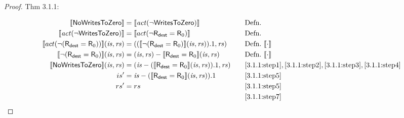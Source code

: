 \documentclass[12pt, letterpaper]{article}
\newcommand\interp[1]{\llbracket #1 \rrbracket}
\begin{document}
\begin{proof}
 Thm 3.1.1:
 \par\nobreak
 {\fontsize{10pt}{12pt}\selectfont
   \begin{alignat}{2}
     \setcounter{equation}{0}
     \label{3.1.1:step1}
     \interp{\mathsf{NoWritesToZero}}
     &= \interp{\mathit{act}(\neg \mathsf{WritesToZero})}
     &&\quad \text{Defn.}\\
     \label{3.1.1:step2}
     \interp{\mathit{act}(\neg \mathsf{WritesToZero})}
     &= \interp{act(\neg \mathsf{R}_{\mathsf{dest}} = \mathsf{R}_0)}
     &&\quad \text{Defn.}\\
     \label{3.1.1:step3}
     \interp{act(\neg(\mathsf{R}_{\mathsf{dest}} = \mathsf{R}_0))}(\mathit{is},\mathit{rs})
     &= ((\interp{\neg(\mathsf{R}_{\mathsf{dest}} = \mathsf{R}_0)}(\mathit{is},\mathit{rs})).1, \mathit{rs})
     &&\quad \text{Defn.}\ \interp{\cdot}\\    
     \label{3.1.1:step4}
     \interp{\neg(\mathsf{R}_{\mathsf{dest}} = \mathsf{R}_0)}(\mathit{is},\mathit{rs})
     &= (\mathit{is},\mathit{rs}) - \interp{\mathsf{R}_{\mathsf{dest}} = \mathsf{R}_0}(\mathit{is},\mathit{rs})
     &&\quad \text{Defn.}\ \interp{\cdot}\\    
     \label{3.1.1:step5}
     \interp{\mathsf{NoWritesToZero}}(\mathit{is},\mathit{rs})
     &= (\mathit{is} - (\interp{\mathsf{R}_{\mathsf{dest}} = \mathsf{R}_0}(\mathit{is},\mathit{rs})).1, \mathit{rs})
     &&\quad \ref{3.1.1:step1},\ref{3.1.1:step2},\ref{3.1.1:step3},\ref{3.1.1:step4}\\
     \label{3.1.1:step6}
     is' &= \mathit{is} - (\interp{\mathsf{R}_{\mathsf{dest}} = \mathsf{R}_0}(\mathit{is},\mathit{rs})).1
     &&\quad \ref{3.1.1:step5} \\
     \label{3.1.1:step7}
     rs' &= rs 
     &&\quad \ref{3.1.1:step5} \\
     \label{3.1.1:step8}
     &\qedhere
    &&\quad \ref{3.1.1:step7}
   \end{alignat}
 }%
 \end{proof}
 
\end{document}

